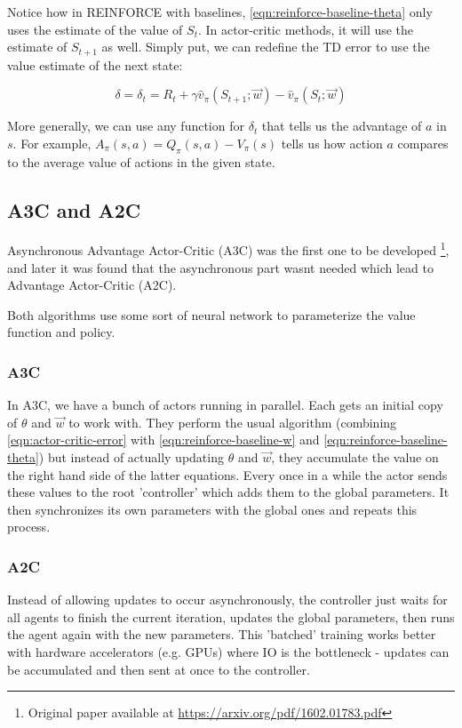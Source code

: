 \documentclass[11pt]{report}
\begin{document}
Notice how in REINFORCE with baselines, \autoref{eqn:reinforce-baseline-theta} only uses the estimate of the value of $S_t$. In actor-critic methods, it will use the estimate of $S_{t+1}$ as well. Simply put, we can redefine the TD error to use the value estimate of the next state:

\begin{equation}
	\label{eqn:actor-critic-error}
	\delta = \delta_t = R_{t} + \gamma \hat{v}_\pi(S_{t+1}; \vec{w}) - \hat{v}_\pi(S_t; \vec{w})
\end{equation}

More generally, we can use any function for $\delta_t$ that tells us the advantage of $a$ in $s$. For example, $A_\pi(s, a) = Q_\pi(s, a) - V_\pi(s)$ tells us how action $a$ compares to the average value of actions in the given state.

\subsection{A3C and A2C}
Asynchronous Advantage Actor-Critic (A3C) was the first one to be developed \footnote[1]{Original paper available at \href{https://arxiv.org/pdf/1602.01783.pdf}{https://arxiv.org/pdf/1602.01783.pdf}}, and later it was found that the asynchronous part wasnt needed which lead to Advantage Actor-Critic (A2C).

Both algorithms use some sort of neural network to parameterize the value function and policy.

\subsubsection{A3C}
In A3C, we have a bunch of actors running in parallel. Each gets an initial copy of $\theta$ and $\vec{w}$ to work with. They perform the usual algorithm (combining \autoref{eqn:actor-critic-error} with \autoref{eqn:reinforce-baseline-w} and \autoref{eqn:reinforce-baseline-theta}) but instead of actually updating $\theta$ and $\vec{w}$, they accumulate the value on the right hand side of the latter equations. Every once in a while the actor sends these values to the root 'controller' which adds them to the global parameters. It then synchronizes its own parameters with the global ones and repeats this process.

\subsubsection{A2C}
Instead of allowing updates to occur asynchronously, the controller just waits for all agents to finish the current iteration, updates the global parameters, then runs the agent again with the new parameters. This 'batched' training works better with hardware accelerators (e.g. GPUs) where IO is the bottleneck - updates can be accumulated and then sent at once to the controller.
\end{document}
